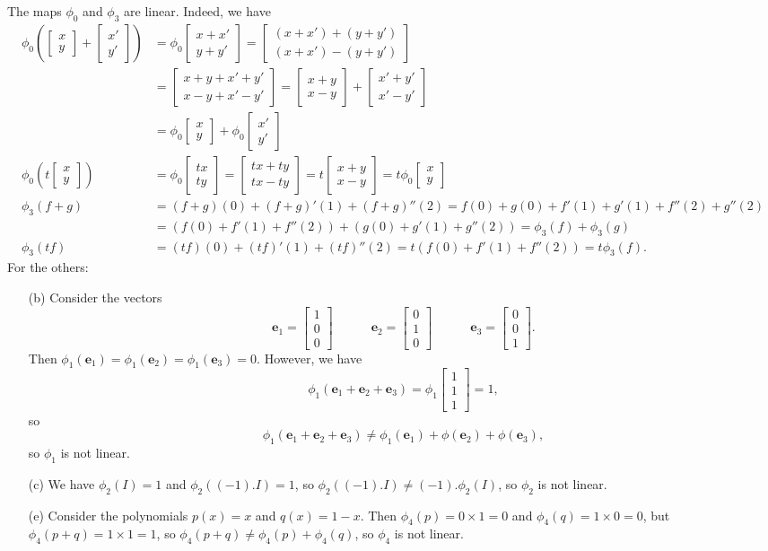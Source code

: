 \documentclass{amsart}
\newcommand{\bsm}       {\left[\begin{smallmatrix}}
\newcommand{\esm}       {\end{smallmatrix}\right]}
\newcommand{\tm}        {\times}
\newcommand{\ve}        {\mathbf{e}}
\renewcommand{\:}       {\colon}
\theoremstyle{definition}
\renewenvironment{solution}{\SolutionAtEnd}{\endSolutionAtEnd}
\begin{document}
\begin{solution}
 The maps $\phi_0$ and $\phi_3$ are linear.  Indeed, we have
 \begin{align*}
  \phi_0\left(\bsm x\\ y\esm + \bsm x'\\ y'\esm\right) &=
  \phi_0\bsm x+x' \\ y+y' \esm = 
  \bsm (x+x')+(y+y') \\ (x+x')-(y+y') \esm \\
  &= \bsm x+y+x'+y' \\ x-y+x'-y' \esm = 
   \bsm x+y \\ x-y \esm + \bsm x'+y' \\ x'-y'\esm  \\
  &= \phi_0\bsm x\\ y\esm + \phi_0\bsm x'\\ y'\esm \\
  \phi_0\left(t\bsm x\\y\esm\right) &= 
   \phi_0\bsm tx\\ ty \esm = \bsm tx+ty\\ tx-ty\esm =
   t\bsm x+y\\ x-y\esm = t\phi_0\bsm x\\ y\esm \\
  \phi_3(f+g) &= 
   (f+g)(0) + (f+g)'(1) + (f+g)''(2) 
   = f(0) + g(0) + f'(1) + g'(1) + f''(2) + g''(2) \\
   &= (f(0)+f'(1)+f''(2)) + (g(0)+g'(1)+g''(2)) 
    = \phi_3(f) + \phi_3(g) \\
  \phi_3(tf) &= (tf)(0) + (tf)'(1) + (tf)''(2) 
    = t(f(0) + f'(1) + f''(2)) = t\phi_3(f).
 \end{align*}
 For the others:
 \begin{itemize}
  \item[(b)] Consider the vectors
   \[ \ve_1=\bsm 1\\0\\0 \esm \hspace{3em}
      \ve_2=\bsm 0\\1\\0 \esm \hspace{3em}
      \ve_3=\bsm 0\\0\\1 \esm.
   \]
   Then $\phi_1(\ve_1)=\phi_1(\ve_2)=\phi_1(\ve_3)=0$.  However,
   we have 
   \[ \phi_1(\ve_1+\ve_2+\ve_3) = \phi_1\bsm 1\\1\\1\esm =  1, \]
   so
   \[ \phi_1(\ve_1+\ve_2+\ve_3)\neq
       \phi_1(\ve_1)+\phi(\ve_2)+\phi(\ve_3),
   \]
   so $\phi_1$ is not linear.
  \item[(c)] We have $\phi_2(I)=1$ and $\phi_2((-1).I)=1$,
   so $\phi_2((-1).I)\neq(-1).\phi_2(I)$, so $\phi_2$ is not
   linear.
  \item[(e)] Consider the polynomials $p(x)=x$ and
   $q(x)=1-x$.  Then $\phi_4(p)=0\tm 1=0$ and
   $\phi_4(q)=1\tm 0=0$, but $\phi_4(p+q)=1\tm 1=1$, so
   $\phi_4(p+q)\neq\phi_4(p)+\phi_4(q)$, so $\phi_4$ is not
   linear. 
 \end{itemize}
\end{solution}
\end{document}
